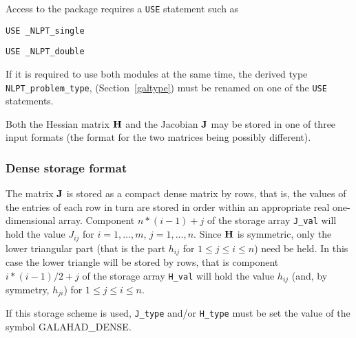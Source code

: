 \documentclass{galahad}
\newcommand{\packagename}{NLPT}
\newcommand{\fullpackagename}{\libraryname\_\packagename}
\newcommand{\sym}{\sf\small}
\begin{document}

\galhowto


Access to the package requires a {\tt USE} statement such as

\medskip{}

\hspace{8mm} {\tt USE \fullpackagename\_single}

\medskip{}

\hspace{8mm} {\tt USE \fullpackagename\_double}

\medskip

\noindent
If it is required to use both modules at the same time, the derived type
{\tt NLPT\_problem\_type},
(Section~\ref{galtype})
must be renamed on one of the {\tt USE} statements.


\galmatrix
Both the Hessian matrix ${\mathbf{H}}$ and the Jacobian ${\mathbf{J}}$
may be stored in one of three input formats (the format for the two matrices
being possibly different).

\subsubsection{Dense storage format}\label{dense}

The matrix ${\mathbf{J}}$ is stored as a compact
dense matrix by rows, that is, the values of the entries of each row in turn are
stored in order within an appropriate real one-dimensional array.
Component $n \ast (i-1) + j$ of the storage array {\tt J\_val} will hold the
value $J_{ij}$ for $i = 1, \ldots , m$, $j = 1, \ldots , n$.
Since ${\mathbf{H}}$ is symmetric, only the lower triangular part (that is the part
$h_{ij}$ for $1 \leq j \leq i \leq n$) need be held. In this case
the lower triangle will be stored by rows, that is
component $i \ast (i-1)/2 + j$ of the storage array {\tt H\_val}
will hold the value $h_{ij}$ (and, by symmetry, $h_{ji}$)
for $1 \leq j \leq i \leq n$.

\noindent
If this storage scheme is used, {\tt J\_type} and/or {\tt H\_type} must be set
the value of the symbol {\sym GALAHAD\_DENSE}.
\end{document}

